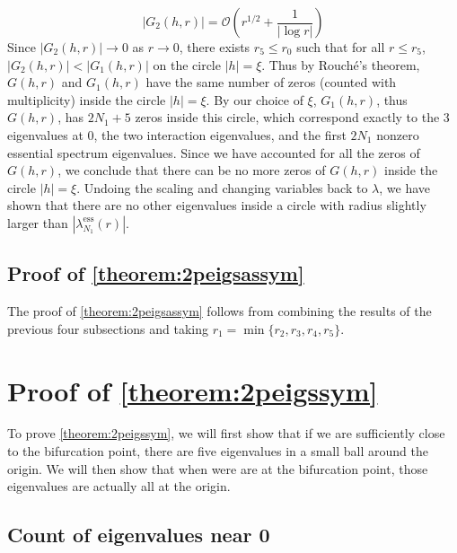 \documentclass[thesis.tex]{subfiles}
\begin{document}
\[
|G_2(h,r)| = \mathcal{O}\left( r^{1/2} + \frac{1}{|\log r|} \right)
\]
Since $|G_2(h,r)| \rightarrow 0$ as $r \rightarrow 0$, there exists $r_5 \leq r_0$ such that for all $r \leq r_5$, $|G_2(h,r)| < |G_1(h,r)|$ on the circle $|h| = \xi$. Thus by Rouch\'{e}'s theorem, $G(h,r)$ and $G_1(h,r)$ have the same number of zeros (counted with multiplicity) inside the circle $|h| = \xi$. By our choice of $\xi$, $G_1(h,r)$, thus $G(h,r)$, has $2 N_1 + 5$ zeros inside this circle, which correspond exactly to the 3 eigenvalues at 0, the two interaction eigenvalues, and the first $2 N_1$ nonzero essential spectrum eigenvalues. Since we have accounted for all the zeros of $G(h,r)$, we conclude that there can be no more zeros of $G(h,r)$ inside the circle $|h| = \xi$. Undoing the scaling and changing variables back to $\lambda$, we have shown that there are no other eigenvalues inside a circle with radius slightly larger than $|\lambda_{N_1}^{\text{ess}}(r)|$.

\subsection{Proof of \cref{theorem:2peigsassym}}

The proof of \cref{theorem:2peigsassym} follows from combining the results of the previous four subsections and taking $r_1 = \min\{ r_2, r_3, r_4, r_5 \}$.

\section{Proof of \cref{theorem:2peigssym}}

To prove \cref{theorem:2peigssym}, we will first show that if we are sufficiently close to the bifurcation point, there are five eigenvalues in a small ball around the origin. We will then show that when were are at the bifurcation point, those eigenvalues are actually all at the origin.

\subsection{Count of eigenvalues near 0}
\end{document}
